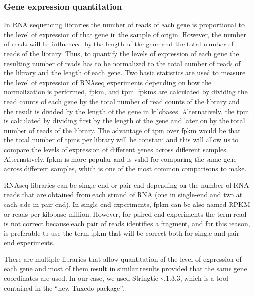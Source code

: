 \subsubsection{Gene expression quantitation}
In RNA sequencing libraries the number of reads of each gene is proportional to the level of expression of that gene in the sample of origin. However, the number of reads will be influenced by the length of the gene and the total number of reads of the library. Thus, to quantify the levels of expression of each gene the resulting number of reads has to be normalized to the total number of reads of the library and the length of each gene. Two basic statistics are used to measure the level of expression of RNAseq experiments depending on how the normalization is performed, \gls{fpkm}, and \gls{tpm}. \glspl{fpkm} are calculated by dividing the read counts of each gene by the total number of read counts of the library and the result is divided by the length of the gene in kilobases. Alternatively, the \gls{tpm} is calculated by dividing first by the length of the gene and later on by the total number of reads of the library. The advantage of \gls{tpm} over \gls{fpkm} would be that the total number of \glspl{tpm} per library will be constant and this will allow us to compare the levels of expression of different genes across different samples. Alternatively, \gls{fpkm} is more popular and is valid for comparing the same gene across different samples, which is one of the most common comparisons to make.

RNAseq libraries can be single-end or pair-end depending on the number of RNA reads that are obtained from each strand of RNA (one in single-end and two at each side in pair-end). In single-end experiments, \gls{fpkm} can be also named RPKM or reads per kilobase million. However, for paired-end experiments the term read is not correct because each pair of reads identifies a fragment, and for this reason, is preferable to use the term \gls{fpkm} that will be correct both for single and pair-end experiments.

There are multiple libraries that allow quantitation of the level of expression of each gene and most of them result in similar results provided that the same gene coordinates are used. In our case, we used Stringtie v.1.3.3, which is a tool contained in the “new Tuxedo package”.\cite{Pertea2016}

